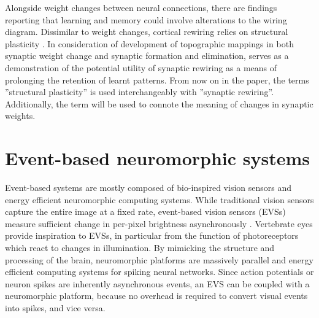 \documentclass[letterpaper, 10 pt, conference]{ieeeconf}  %
\begin{document}



Alongside weight changes between neural connections, there are findings reporting that learning and memory  could involve alterations to the wiring diagram. %
Dissimilar to weight changes, cortical rewiring relies on structural plasticity \cite{Chklovskii2004b}.
In consideration of development of topographic mappings in both synaptic weight change and synaptic formation and elimination, \cite{bamford2010synaptic} serves as a demonstration of the potential utility of synaptic rewiring as a means of prolonging the retention of learnt patterns.
From now on in the paper, the terms ''structural plasticity'' is used interchangeably with ''synaptic rewiring''.
Additionally, the term will be used to connote the meaning of changes in synaptic weights.


\section{Event-based neuromorphic systems}

Event-based systems are mostly composed of bio-inspired vision sensors and energy efficient neuromorphic computing systems. 
While traditional vision sensors capture the entire image at a fixed rate, event-based vision sensors (EVSs) measure sufficient change in per-pixel brightness asynchronously \cite{Gallego2019}.
Vertebrate eyes provide inspiration to EVSs, in particular from the function of photoreceptors which react to changes in illumination.
By mimicking the structure and processing of the brain, neuromorphic platforms are massively parallel and energy efficient computing systems for spiking neural networks.
Since action potentials or neuron spikes are inherently asynchronous events, an EVS can be coupled with a neuromorphic platform, because no overhead is required to convert visual events into spikes, and vice versa.
\end{document}
